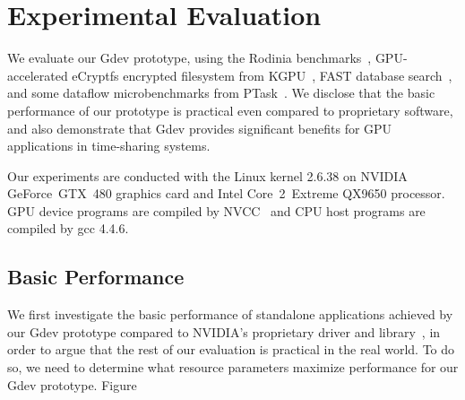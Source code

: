 \section{Experimental Evaluation}
\label{sec:evaluation}

We evaluate our Gdev prototype, using the Rodinia
benchmarks~\cite{Che_IISWC09}, GPU-accelerated eCryptfs encrypted
filesystem from KGPU~\cite{Sun_SECURITY11_Poster}, FAST database
search~\cite{Kim_SIGMOD10}, and some dataflow
microbenchmarks from PTask~\cite{Rossbach_SOSP11}.
We disclose that the basic performance of our prototype is practical
even compared to proprietary software, and also demonstrate that Gdev
provides significant benefits for GPU applications in time-sharing
systems.

Our experiments are conducted with the Linux kernel 2.6.38 on NVIDIA
GeForce~GTX~480 graphics card and Intel Core~2~Extreme QX9650 processor.
GPU device programs are compiled by NVCC~\cite{CUDA40} and CPU host
programs are compiled by gcc 4.4.6.

\subsection{Basic Performance}

We first investigate the basic performance of standalone applications achieved
by our Gdev prototype compared to NVIDIA's proprietary driver and
library~\cite{BLOB,CUDA40}, in order to argue that the rest of our
evaluation is practical in the real world. 
To do so, we need to determine what resource parameters maximize
performance for our Gdev prototype.
Figure

